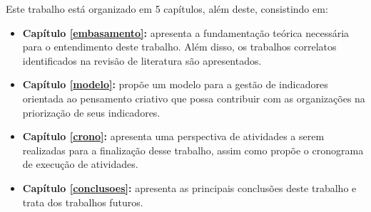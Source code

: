 Este trabalho está organizado em 5 capítulos, além deste, consistindo em:
\begin{itemize}

\item \textbf{Capítulo \ref{embasamento}:} apresenta a fundamentação teórica necessária para o entendimento deste trabalho. Além disso, os trabalhos correlatos identificados na revisão de literatura são apresentados.

\item \textbf{Capítulo \ref{modelo}:} propõe um modelo para a gestão de indicadores orientada ao pensamento criativo que possa contribuir com as organizações na priorização de seus indicadores. 

\item \textbf{Capítulo \ref{crono}:} apresenta uma perspectiva de atividades a serem realizadas para a finalização desse trabalho, assim como propõe o cronograma de execução de atividades. 

\item \textbf{Capítulo \ref{conclusoes}:} apresenta as principais conclusões deste trabalho e trata dos trabalhos futuros.
\end{itemize}





